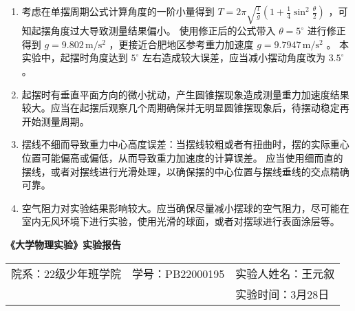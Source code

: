 \documentclass[UTF8]{article}
\begin{document}
{\begin{enumerate}[itemindent=1.3em,parsep=5pt,label=\arabic*.]
        \item 考虑在单摆周期公式计算角度的一阶小量得到 $T=2 \pi \sqrt{\frac{l}{g}}\left(1+\frac{1}{4} \sin ^2 \frac{\theta}{2}\right)$ ，可知起摆角度过大导致测量结果偏小。
        使用修正后的公式带入 $\theta = 5^\circ$ 进行修正得到 $g = 9.802\,\mathrm{m/s^2}$ ，更接近合肥地区参考重力加速度 $g = 9.7947\,\mathrm{m/s^2}$ 。
        本实验中，起摆时角度达到 $5^{\circ}$ 左右造成较大误差，应当减小摆动角度改为 $3.5^{\circ}$ 。
        
        \item 起摆时有垂直平面方向的微小扰动，产生圆锥摆现象造成测量重力加速度结果较大。应当在起摆后观察几个周期确保并无明显圆锥摆现象后，待摆动稳定再开始测量周期。
        
        \item 摆线不细而导致重力中心高度误差：当摆线较粗或者有扭曲时，摆的实际重心位置可能偏高或偏低，从而导致重力加速度的计算误差。
        应当使用细而直的摆线，或者对摆线进行光滑处理，以确保摆的中心位置与摆线垂线的交点精确可靠。
        
        \item 空气阻力对实验结果影响较大。应当确保尽量减小摆球的空气阻力，尽可能在室内无风环境下进行实验，使用光滑的球面，或者对摆球进行表面涂层等。
        
    \end{enumerate}

}

\newpage


\thispagestyle{empty}

    \begin{center}
    \bf\LARGE{《大学物理实验》实验报告}
    \end{center}
     
    \begin{center}
        \centering
        \begin{tabularx}{\textwidth}{XZY}
            {院系：22级少年班学院}&{学号：PB22000195}&{实验人姓名：王元叙}\\
            {}&{}&{实验时间：3月28日}\\
        \hline      
        \end{tabularx}
    \end{center}
    

\end{document}
